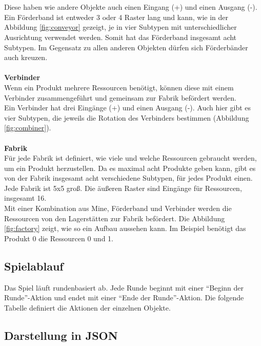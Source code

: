 \\\\
Diese haben wie andere Objekte auch einen Eingang (+) und einen Ausgang (-). Ein Förderband ist entweder 3 oder 4 Raster lang und kann, wie in der Abbildung \ref{fig:conveyor} gezeigt, je in vier Subtypen mit unterschiedlicher Ausrichtung verwendet werden. Somit hat das Förderband insgesamt acht Subtypen.
Im Gegensatz zu allen anderen Objekten dürfen sich Förderbänder auch kreuzen.
\\\\
\textbf{Verbinder}\\
Wenn ein Produkt mehrere Ressourcen benötigt, können diese mit einem Verbinder zusammengeführt und gemeinsam zur Fabrik befördert werden. 
\\
Ein Verbinder hat drei Eingänge (+) und einen Ausgang (-). Auch hier gibt es vier Subtypen, die jeweils die Rotation des Verbinders bestimmen (Abbildung \ref{fig:combiner}).
\\\\
\textbf{Fabrik}\\
Für jede Fabrik ist definiert, wie viele und welche Ressourcen gebraucht werden, um ein Produkt herzustellen. Da es maximal acht Produkte geben kann, gibt es von der Fabrik insgesamt acht verschiedene Subtypen, für jedes Produkt einen. Jede Fabrik ist 5x5 groß. Die äußeren Raster sind Eingänge für Ressourcen, insgesamt 16.
\\
Mit einer Kombination aus Mine, Förderband und Verbinder werden die Ressourcen von den Lagerstätten zur Fabrik befördert. Die Abbildung \ref{fig:factory} zeigt, wie so ein Aufbau aussehen kann. Im Beispiel benötigt das Produkt 0 die Ressourcen 0 und 1.

\subsection{Spielablauf}
Das Spiel läuft rundenbasiert ab. Jede Runde beginnt mit einer “Beginn der Runde”-Aktion und endet mit einer “Ende der Runde”-Aktion.
Die folgende Tabelle definiert die Aktionen der einzelnen Objekte. 



\subsection{Darstellung in JSON}